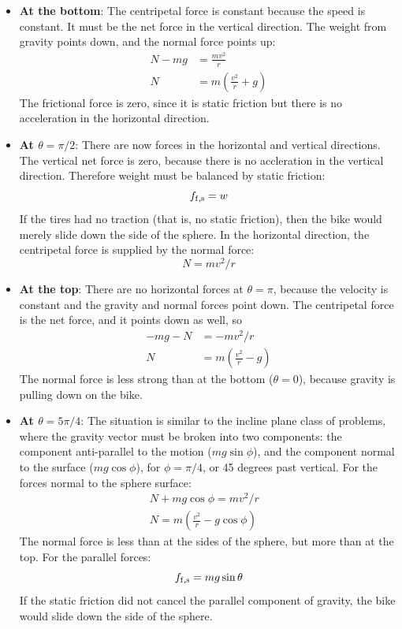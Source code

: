 \documentclass[12pt]{article}
\begin{document}
\begin{itemize}
\item \textbf{At the bottom}: The centripetal force is constant because the speed is constant.  It must be the net force in the vertical direction.  The weight from gravity points down, and the normal force points up:
\begin{align}
N - mg &= \frac{mv^2}{r} \\
N &= m\left(\frac{v^2}{r}+g\right)
\end{align}
The frictional force is zero, since it is static friction but there is no acceleration in the horizontal direction.
\item \textbf{At $\theta = \pi/2$}:  There are now forces in the horizontal and vertical directions.  The vertical net force is zero, because there is no accleration in the vertical direction.  Therefore weight must be balanced by static friction:
\begin{equation}
f_{\rm f,s} = w
\end{equation}
If the tires had no traction (that is, no static friction), then the bike would merely slide down the side of the sphere.  In the horizontal direction, the centripetal force is supplied by the normal force:
\begin{equation}
N = mv^2/r
\end{equation}
\item \textbf{At the top}: There are no horizontal forces at $\theta = \pi$, because the velocity is constant and the gravity and normal forces point down.  The centripetal force is the net force, and it points down as well, so
\begin{align}
-mg - N &= -mv^2/r \\
N &= m\left(\frac{v^2}{r} - g\right)
\end{align}
The normal force is less strong than at the bottom ($\theta = 0$), because gravity is pulling down on the bike.
\item \textbf{At $\theta = 5\pi/4$}: The situation is similar to the incline plane class of problems, where the gravity vector must be broken into two components: the component anti-parallel to the motion ($mg\sin\phi$), and the component normal to the surface ($mg\cos\phi$), for $\phi = \pi/4$, or 45 degrees past vertical.  For the forces normal to the sphere surface:
\begin{align}
N + mg\cos\phi = mv^2/r& \\
N = m\left(\frac{v^2}{r}-g\cos\phi \right)
\end{align}
The normal force is less than at the sides of the sphere, but more than at the top.  For the parallel forces:
\begin{equation}
f_{\rm f,s} = mg\sin\theta
\end{equation}
If the static friction did not cancel the parallel component of gravity, the bike would slide down the side of the sphere.
\end{itemize}
\end{document}
